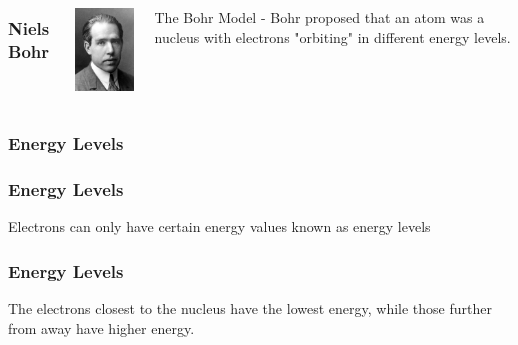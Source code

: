 \documentclass{beamer}
\begin{document}
\begin{frame}
    \begin{columns}
        \frametitle{Niels Bohr}
        \begin{column}{0.5\textwidth}
            \includegraphics[width=3cm]{../../../../public/images/chemists/Bohr.jpg}
        \end{column}
        \begin{column}{0.5\textwidth}
            The Bohr Model - Bohr proposed that an atom was a nucleus with electrons "orbiting" in different 
            \pause \alert{energy levels}.
            \vspace{1cm}

        
        \end{column}
    \end{columns}
\end{frame}


\subsubsection{Energy Levels}

\begin{frame}
    \frametitle{Energy Levels}
    \onslide Electrons can only have certain energy values known as
    \pause \alert{energy levels} 
\end{frame}

\begin{frame}
    \frametitle{Energy Levels}
    \onslide The electrons closest to the nucleus have the 
    \pause \alert{lowest} 
    \onslide energy, while those further from away have 
    \pause\alert{higher} 
    \onslide energy.
    \vspace{.5cm}

    
\end{frame}
\end{document}
